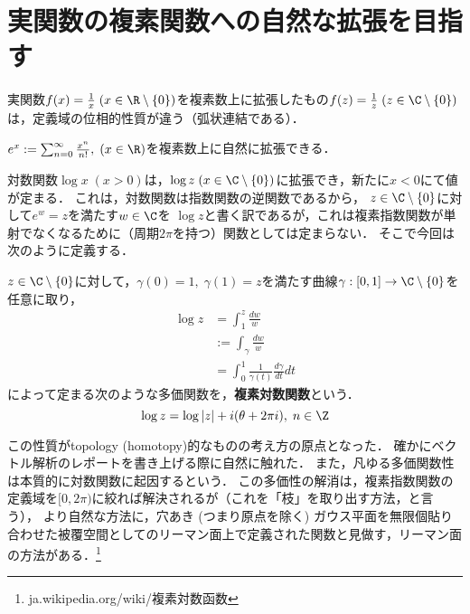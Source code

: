 \documentclass[uplatex, dvipdfmx]{jsreport}
\begin{document}
\section{実関数の複素関数への自然な拡張を目指す}

\begin{example*}[定義域の位相的性質が変わる]
    実関数$f(x)=\frac{1}{x}\;(x\in\R\setminus\{0\})$を複素数上に拡張したもの$f(z)=\frac{1}{z}\;(z\in\C\setminus\{0\})$は，定義域の位相的性質が違う（弧状連結である）．
\end{example*}
\begin{example*}
    $e^x:=\sum^{\infty}_{n=0}\frac{x^n}{n!},\;(x\in\R)$を複素数上に自然に拡張できる．
\end{example*}
\begin{example*}[新しく考慮可能になる値が出現する]
    対数関数$\log x\;(x>0)$は，$\log z\;(x\in\C\setminus\{0\})$に拡張でき，新たに$x<0$にて値が定まる．
    これは，対数関数は指数関数の逆関数であるから，
    $z\in\C\setminus\{0\}$に対して$e^w=z$を満たす$w\in\C$を
    $\log z$と書く訳であるが，これは複素指数関数が単射でなくなるために（周期$2\pi$を持つ）関数としては定まらない．
    そこで今回は次のように定義する．

    \begin{definition*}
        $z\in\C\setminus\{0\}$に対して，$\gamma(0)=1,\;\gamma(1)=z$を満たす曲線$\gamma:[0,1]\to\C\setminus\{0\}$を
        任意に取り，
        \begin{align*}
            \log z&=\int^z_1\frac{dw}{w}\\
            &:= \int_\gamma\frac{dw}{w}\\
            &=\int^1_0\frac{1}{\gamma(t)}\frac{d\gamma}{dt}dt
        \end{align*}
        によって定まる次のような多価関数を，\textbf{複素対数関数}という．
        \[ \log z=\log|z| + i(\theta+2\pi i),\;n\in\Z \]
    \end{definition*}
    \begin{remark*}
        この性質がtopology (homotopy)的なものの考え方の原点となった．
        確かにベクトル解析のレポートを書き上げる際に自然に触れた．
        また，凡ゆる多価関数性は本質的に対数関数に起因するという．
        この多価性の解消は，複素指数関数の定義域を$[0,2\pi)$に絞れば解決されるが（これを「枝」を取り出す方法，と言う），
        より自然な方法に，穴あき (つまり原点を除く) ガウス平面を無限個貼り合わせた被覆空間としてのリーマン面上で定義された関数と見做す，リーマン面の方法がある．\footnote{ja.wikipedia.org/wiki/複素対数函数}
    \end{remark*}
\end{example*}
\end{document}

